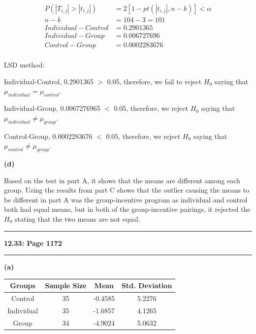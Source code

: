 \documentclass[11pt]{article}
\newcommand\question[2]{\vspace{.25in}\hrule\textbf{#1: #2}\vspace{.5em}\hrule\vspace{.10in}}
\renewcommand\part[1]{\vspace{.10in}\textbf{(#1)}\par}
\begin{document}
		\begin{align*}
			P(|T_{i,j}| > |t_{i,j}|) &= 2[1-pt(|t_{i,j}|, n-k)] < \alpha \\
			n-k &= 104-3=101\\
			Individual-Control &= 0.2901365\\
			Individual-Group &= 0.006727696\\
			Control-Group &= 0.0002283676\\
		\end{align*}\par
		
		LSD method:\par
		Individual-Control, 0.2901365 $>$ 0.05, therefore, we fail to reject $H_{0}$ saying that $\mu_{individual}=\mu_{control}$.\par
		Individual-Group, 0.0067276965 $<$ 0.05, therefore, we reject $H_{0}$ saying that $\mu_{individual} \ne \mu_{group}$.\par
		Control-Group, 0.0002283676 $<$ 0.05, therefore, we reject $H_{0}$ saying that $\mu_{control} \ne \mu_{group}$.\par
	\part{d}
    Based on the test in part A, it shows that the means are different among each group. 
    Using the results from part C shows that the outlier causing the means to be different in 
    part A was the group-incentive program as individual and control both had equal means, but in 
    both of the group-incentive pairings, it rejected the $H_{0}$ stating that the two means are not 
    equal.\par
	

\question{12.33}{Page 1172}
	\part{a}
	
		\begin{tabular}{|c|c|c|c|}
			\hline
			Groups & Sample Size & Mean & Std. Deviation\\
			\hline
			Control & 35 & -0.4585 & 5.2276\\
			\hline
			Individual & 35 & -1.6857 & 4.1265\\
			\hline
			Group & 34 & -4.9024 & 5.0632\\
			\hline
		\end{tabular}\par
	
\end{document}

